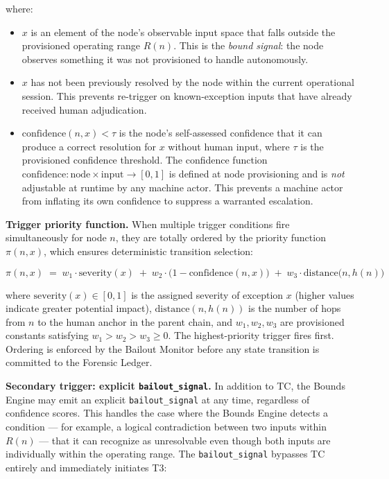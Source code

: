 where:

\begin{itemize}\itemsep=0pt
\item[(i)] $x$ is an element of the node's observable input space that falls outside the provisioned operating range $R(n)$. This is the \emph{bound signal}: the node observes something it was not provisioned to handle autonomously.

\item[(ii)] $x$ has not been previously resolved by the node within the current operational session. This prevents re-trigger on known-exception inputs that have already received human adjudication.

\item[(iii)] $\text{confidence}(n, x) < \tau$ is the node's self-assessed confidence that it can produce a correct resolution for $x$ without human input, where $\tau$ is the provisioned confidence threshold. The confidence function $\text{confidence} : \text{node} \times \text{input} \rightarrow [0, 1]$ is defined at node provisioning and is \emph{not} adjustable at runtime by any machine actor. This prevents a machine actor from inflating its own confidence to suppress a warranted escalation.
\end{itemize}

\bigskip
\noindent\textbf{Trigger priority function.} When multiple trigger conditions fire simultaneously for node $n$, they are totally ordered by the priority function $\pi(n, x)$, which ensures deterministic transition selection:

\begin{equation}
\pi(n, x) \;=\; w_1 \cdot \text{severity}(x) \;+\; w_2 \cdot \bigl(1 - \text{confidence}(n, x)\bigr) \;+\; w_3 \cdot \text{distance}\bigl(n, h(n)\bigr) \tag{PF}
\end{equation}

where $\text{severity}(x) \in [0, 1]$ is the assigned severity of exception $x$ (higher values indicate greater potential impact), $\text{distance}(n, h(n))$ is the number of hops from $n$ to the human anchor in the parent chain, and $w_1, w_2, w_3$ are provisioned constants satisfying $w_1 > w_2 > w_3 \geq 0$. The highest-priority trigger fires first. Ordering is enforced by the Bailout Monitor before any state transition is committed to the Forensic Ledger.

\bigskip
\noindent\textbf{Secondary trigger: explicit \texttt{bailout\_signal}.} In addition to TC, the Bounds Engine may emit an explicit \texttt{bailout\_signal} at any time, regardless of confidence scores. This handles the case where the Bounds Engine detects a condition — for example, a logical contradiction between two inputs within $R(n)$ — that it can recognize as unresolvable even though both inputs are individually within the operating range. The \texttt{bailout\_signal} bypasses TC entirely and immediately initiates T3:

